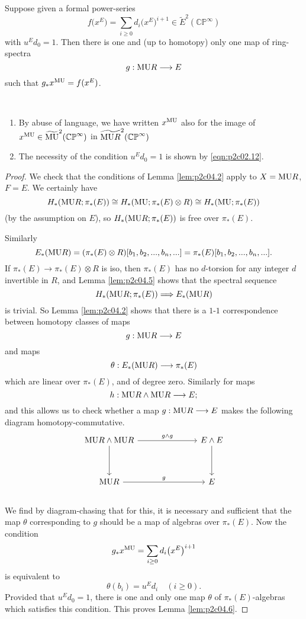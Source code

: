 \documentclass[../main]{subfiles}
\begin{document}
\begin{customlemma}{4.6}
\label{lem:p2c04.6}
Suppose given a formal power-series
\[f\big(x^E\big)=\sum_{i\geq 0}d_i\big(x^E\big)^{i+1}\in\tilde{E}^2(\mathbb{CP}^\infty)\]
with $u^Ed_0=1$. Then there is one and (up to homotopy) only one map of ring-spectra
\[g:\mathrm{MU}R\longrightarrow E\]
such that $g_\ast x^{\mathrm{MU}}=f(x^E)$.
\end{customlemma}
\begin{notes}
~
\begin{enumerate}
    \item By abuse of language, we have written $x^{\mathrm{MU}}$ also for the image of $x^{\mathrm{MU}}\in\widetilde{\mathrm{MU}}^2(\mathbb{CP}^\infty)$ in $\widetilde{\mathrm{MU}R}^2(\mathbb{CP}^\infty)$
    \item The necessity of the condition $u^Ed_0=1$ is shown by \ref{eqn:p2c02.12}.
\end{enumerate}
\end{notes}
\begin{proof}
We check that the conditions of Lemma \ref{lem:p2c04.2} apply to $X=\mathrm{MU}R$, $F=E$. We certainly have
\[H_\ast(\mathrm{MU}R;\pi_\ast(E))\cong H_\ast(\mathrm{MU};\pi_\ast(E)\otimes R)\cong H_\ast(\mathrm{MU};\pi_\ast(E))\]
(by the assumption on $E$), so $H_\ast(\mathrm{MU}R;\pi_\ast(E))$ is free over $\pi_\ast(E)$. 

Similarly
\[E_\ast(\mathrm{MU}R)=(\pi_\ast(E)\otimes R)[b_1,b_2,...,b_n,...]=\pi_\ast(E)[b_1,b_2,...,b_n,...].\]
If $\pi_\ast(E)\longrightarrow \pi_\ast(E)\otimes R$ is iso, then $\pi_\ast(E)$ has no $d$-torsion for any integer $d$ invertible in $R$, and Lemma \ref{lem:p2c04.5} shows that the spectral sequence
\[H_\ast(\mathrm{MU}R;\pi_\ast(E))\Longrightarrow E_\ast(\mathrm{MU}R)\]
is trivial. So Lemma \ref{lem:p2c04.2} shows that there is a $1$-$1$ correspondence between homotopy classes of maps
\[g:\mathrm{MU}R\longrightarrow E\]
and maps
\[\theta:E_\ast(\mathrm{MU}R)\longrightarrow \pi_\ast(E)\]
which are linear over $\pi_\ast(E)$, and of degree zero. Similarly for maps
\[h:\mathrm{MU}R\wedge \mathrm{MU}R \longrightarrow E;\]
and this allows us to check whether a map $g:\mathrm{MU}R\longrightarrow E$ makes the following diagram homotopy-commutative.
~\\
\[\begin{tikzcd}
\te{MU}R\wedge \te{MU}R &&& E\wedge E \\
\\
\te{MU}R &&& E
\arrow["g\wedge g", from=1-1, to=1-4]
\arrow[from=1-1, to=3-1]
\arrow["g", from=3-1, to=3-4]
\arrow[from=1-4, to=3-4]
\end{tikzcd}\]
~\\
We find by diagram-chasing that for this, it is necessary and sufficient that the map $\theta$ corresponding to $g$ should be a map of algebras over $\pi_\ast(E)$. Now the condition
\[g_\ast x^{\mathrm{MU}}=\sum_{i\geq 0} d_i\big(x^E\big)^{i+1}\]
is equivalent to
\[\theta(b_i)=u^Ed_i\quad (i\geq 0).\]
Provided that $u^Ed_0=1$, there is one and only one map $\theta$ of $\pi_\ast(E)$-algebras which satisfies this condition. This proves Lemma \ref{lem:p2c04.6}.
\end{proof}
\end{document}
